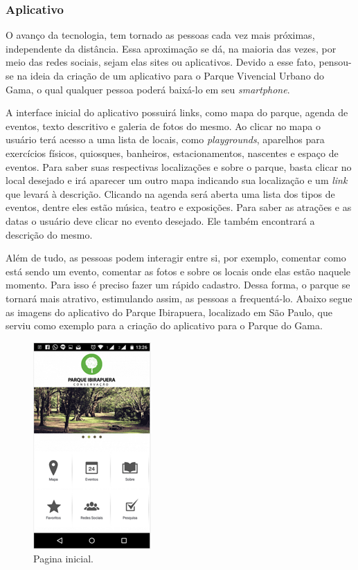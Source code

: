 \subsubsection{Aplicativo}

	O avanço da tecnologia, tem tornado as pessoas cada vez mais próximas, independente da distância. Essa aproximação se dá, na maioria das vezes, por meio das redes sociais, sejam elas sites ou aplicativos. Devido a esse fato, pensou-se na ideia da criação de um aplicativo para o Parque Vivencial Urbano do Gama, o qual qualquer pessoa poderá baixá-lo em seu \textit{smartphone}.
	
	A interface inicial do aplicativo possuirá links, como mapa do parque, agenda de eventos, texto descritivo e galeria de fotos do mesmo. Ao clicar no mapa o usuário terá acesso a uma lista de locais, como \textit{playgrounds}, aparelhos para exercícios físicos, quiosques, banheiros, estacionamentos, nascentes e espaço de eventos. Para saber suas respectivas localizações e sobre o parque, basta clicar no local desejado e irá aparecer um outro mapa indicando sua localização e um \textit{link} que levará à descrição. Clicando na agenda será aberta uma lista dos tipos de eventos, dentre eles estão música, teatro e exposições. Para saber as atrações e as datas o usuário deve clicar no evento desejado. Ele também encontrará a descrição do mesmo.

	Além de tudo, as pessoas podem interagir entre si, por exemplo, comentar como está sendo um evento, comentar as fotos e sobre os locais onde elas estão naquele momento. Para isso é preciso fazer um rápido cadastro. Dessa forma, o parque se tornará mais atrativo, estimulando assim, as pessoas a frequentá-lo. 
Abaixo segue as imagens do aplicativo do Parque Ibirapuera, localizado em São Paulo, que serviu como exemplo para a criação do aplicativo para o Parque do Gama.

\begin{figure}[H]
	 \centering
	\label{Pagina inicial do aplicativo}
	 \includegraphics[keepaspectratio=true,scale=0.8]{interacao/17.png}
	 \caption{Pagina inicial.}
\end{figure}
	

